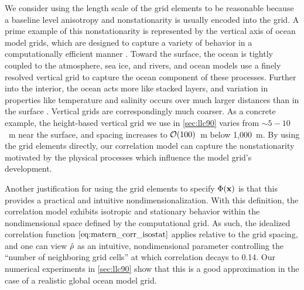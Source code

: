 We consider using the length scale of the grid elements to be reasonable
because a baseline level anisotropy and nonstationarity is usually encoded
into the grid.
A prime example of this nonstationarity is represented by the vertical axis of
ocean model grids, which are designed to capture a variety of behavior in a
computationally efficient manner \citep{griffies_fundamentals_2004}.
Toward the surface, the ocean is tightly coupled to the atmosphere, sea ice, and
rivers, and ocean models use a finely resolved vertical grid to capture the
ocean component of these processes.
Further into the interior, the ocean acts more like stacked layers, and
variation in properties like temperature and salinity occurs over much larger
distances than in the surface \citep{talley_descriptive_2011}.
Vertical grids are correspondingly much coarser.
As a concrete example, the height-based vertical grid we use in \cref{sec:llc90}
varies from $\sim 5-10$~m near the surface, and spacing increases to
$\mathcal{O}(100)$~m below 1,000~m.
By using the grid elements directly, our correlation model can capture the
nonstationarity motivated by the physical processes which influence the model
grid's development.

Another justification for using the grid elements to specify $\Phi(\mathbf{x})$ is
that this provides a practical and intuitive nondimensionalization.
With this definition, the correlation model exhibits isotropic and stationary
behavior within the nondimensional space defined by the computational grid.
As such, the idealized correlation function $\cref{eq:matern_corr_isostat}$
applies relative to the grid spacing, and one can view $\hat{\rho}$ as an
intuitive, nondimensional parameter controlling the
``number of neighboring grid cells'' at which correlation decays to 0.14.
Our numerical experiments in \cref{sec:llc90} show that this is a good
approximation in the case of a realistic global ocean model grid.


